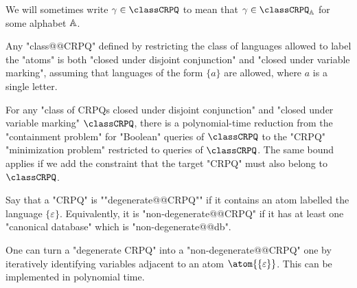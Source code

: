 We will sometimes write $\gamma \in \classCRPQ$ to mean that $\gamma\in\classCRPQ_{\A}$
for some alphabet $\mathbb{A}$.

\begin{fact}
	Any "class@@CRPQ" defined by restricting the class of languages allowed to
	label the "atoms" is both "closed under disjoint conjunction" and "closed under variable marking", assuming that languages of
	the form $\{a\}$ are allowed, where $a$ is a single letter.
\end{fact}

\begin{theorem}
	\AP\label{thm:reduction-containment-to-variable-minimization}
	For any "class of CRPQs closed under disjoint conjunction" and
	"closed under variable marking"
	$\classCRPQ$, there is a polynomial-time reduction
	from the "containment problem" for "Boolean" queries of $\classCRPQ$ to the "CRPQ" 
	"minimization problem" restricted to queries of $\classCRPQ$. 
	The same bound applies if we add the constraint that the target "CRPQ" must also belong to $\classCRPQ$.
\end{theorem}

Say that a "CRPQ" is \AP""degenerate@@CRPQ"" if it contains an atom labelled the language $\{\varepsilon\}$.
Equivalently, it is "non-degenerate@@CRPQ" if it has at least one "canonical database"
which is "non-degenerate@@db".

\begin{fact}
	\AP\label{fact:produce-non-degenerate}
	One can turn a "degenerate CRPQ" into a "non-degenerate@@CRPQ" one by
	iteratively identifying variables adjacent to an atom $\atom{\{\varepsilon\}}$.
	This can be implemented in polynomial time.
\end{fact}

